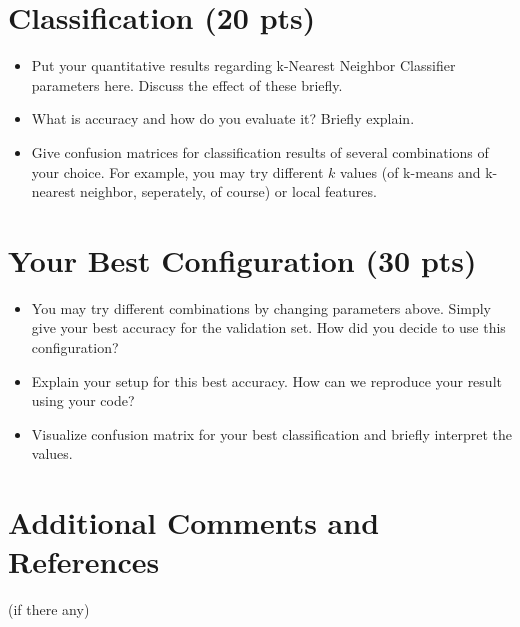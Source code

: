 \documentclass[12pt]{article}
\begin{document}
\section{Classification (20 pts)}
    \begin{itemize}
        \item Put your quantitative results regarding k-Nearest Neighbor Classifier parameters here. Discuss the effect of these briefly.
        \item What is accuracy and how do you evaluate it? Briefly explain.
        \item Give confusion matrices for classification results of several combinations of your choice. For example, you may try different $k$ values (of k-means and k-nearest neighbor, seperately, of course) or local features.
    \end{itemize}

\section{Your Best Configuration (30 pts)}
    \begin{itemize}
        \item You may try different combinations by changing parameters above. Simply give your best accuracy for the validation set. How did you decide to use this configuration?
        
        
        \item Explain your setup for this best accuracy. How can we reproduce your result using your code?
        
        \item Visualize confusion matrix for your best classification and briefly interpret the values.
        
    \end{itemize}

\section{Additional Comments and References}

    (if there any)
\end{document}
